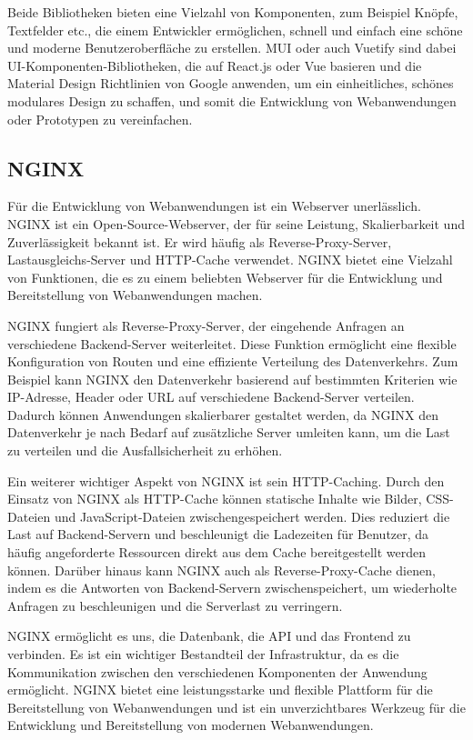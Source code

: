 Beide Bibliotheken bieten eine Vielzahl von Komponenten, zum Beispiel Knöpfe, Textfelder etc., die einem Entwickler ermöglichen, schnell und einfach eine schöne und moderne Benutzeroberfläche zu erstellen. \acf{MUI} oder auch Vuetify sind dabei \acs{UI}-Komponenten-Bibliotheken, die auf React.js oder Vue basieren und die Material Design Richtlinien von Google anwenden, um ein einheitliches, schönes modulares Design zu schaffen, und somit die Entwicklung von Webanwendungen oder Prototypen zu vereinfachen.\cite{materialui, vuetify}

\subsection{NGINX}

Für die Entwicklung von Webanwendungen ist ein Webserver unerlässlich. \acf{NGINX} ist ein Open-Source-Webserver, der für seine Leistung, Skalierbarkeit und Zuverlässigkeit bekannt ist. Er wird häufig als Reverse-Proxy-Server, Lastausgleichs-Server und HTTP-Cache verwendet. \acs{NGINX} bietet eine Vielzahl von Funktionen, die es zu einem beliebten Webserver für die Entwicklung und Bereitstellung von Webanwendungen machen.

\acs{NGINX} fungiert als Reverse-Proxy-Server, der eingehende Anfragen an verschiedene Backend-Server weiterleitet. Diese Funktion ermöglicht eine flexible Konfiguration von Routen und eine effiziente Verteilung des Datenverkehrs. Zum Beispiel kann \acs{NGINX} den Datenverkehr basierend auf bestimmten Kriterien wie IP-Adresse, Header oder URL auf verschiedene Backend-Server verteilen. Dadurch können Anwendungen skalierbarer gestaltet werden, da \acs{NGINX} den Datenverkehr je nach Bedarf auf zusätzliche Server umleiten kann, um die Last zu verteilen und die Ausfallsicherheit zu erhöhen.

Ein weiterer wichtiger Aspekt von \acs{NGINX} ist sein HTTP-Caching. Durch den Einsatz von \acs{NGINX} als HTTP-Cache können statische Inhalte wie Bilder, CSS-Dateien und JavaScript-Dateien zwischengespeichert werden. Dies reduziert die Last auf Backend-Servern und beschleunigt die Ladezeiten für Benutzer, da häufig angeforderte Ressourcen direkt aus dem Cache bereitgestellt werden können. Darüber hinaus kann \acs{NGINX} auch als Reverse-Proxy-Cache dienen, indem es die Antworten von Backend-Servern zwischenspeichert, um wiederholte Anfragen zu beschleunigen und die Serverlast zu verringern.

\acs{NGINX} ermöglicht es uns, die Datenbank, die \acs{API} und das Frontend zu verbinden. Es ist ein wichtiger Bestandteil der Infrastruktur, da es die Kommunikation zwischen den verschiedenen Komponenten der Anwendung ermöglicht. \acs{NGINX} bietet eine leistungsstarke und flexible Plattform für die Bereitstellung von Webanwendungen und ist ein unverzichtbares Werkzeug für die Entwicklung und Bereitstellung von modernen Webanwendungen. \cite{nginx}

